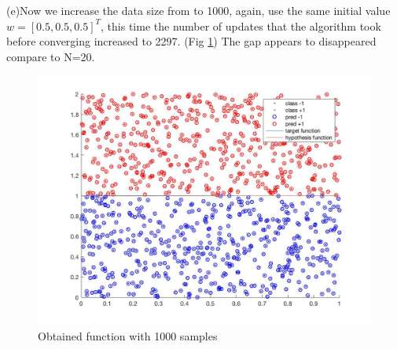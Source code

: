 \documentclass[12pt]{article}
\begin{document}
\indent(e)Now we increase the data size from to 1000, again, use the same initial value $w=[0.5,0.5,0.5]^T$, this time the number of updates that the algorithm took before converging increased to 2297. (Fig \ref{fig:Pic6}) The gap appears to disappeared compare to N=20.
\begin{figure}[H]
  \centering
  \includegraphics[scale = 0.25]{Pic6.jpg}
  \caption{Obtained function with 1000 samples}
  \label{fig:Pic6}
\end{figure}
\end{document}
